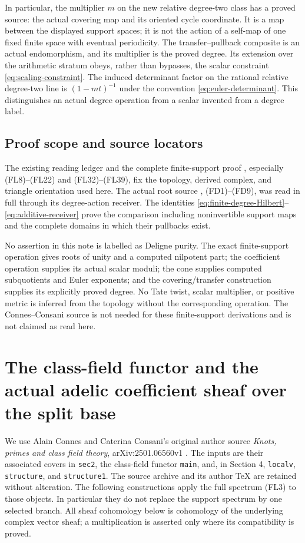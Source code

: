 \documentclass[11pt,a4paper]{article}
\theoremstyle{definition}\newtheorem{definition}[theorem]{Definition}
\begin{document}
In particular, the multiplier $m$ on the new relative degree-two
class has a proved source: the actual covering map and its oriented
cycle coordinate. It is a map between the displayed support spaces;
it is not the action of a self-map of one fixed finite space with
eventual periodicity. The transfer--pullback composite is an actual
endomorphism, and its multiplier is the proved degree. Its extension
over the arithmetic stratum obeys, rather than bypasses, the scalar
constraint \eqref{eq:scaling-constraint}. The induced determinant
factor on the rational relative degree-two line is $(1-mt)^{-1}$
under the convention \eqref{eq:euler-determinant}. This distinguishes
an actual degree operation from a scalar invented from a degree label.

\subsection{Proof scope and source locators}

The existing reading ledger and the complete finite-support proof
, especially (FL8)--(FL22)
and (FL32)--(FL39), fix the topology, derived complex, and triangle
orientation used here. The actual root source
,
(FD1)--(FD9), was read in full through its degree-action receiver.
The identities \eqref{eq:finite-degree-Hilbert}--\eqref{eq:additive-receiver}
prove the comparison including noninvertible support maps and the
complete domains in which their pullbacks exist.

No assertion in this note is labelled as Deligne purity. The exact
finite-support operation gives roots of unity and a computed nilpotent
part; the coefficient operation supplies its actual scalar moduli;
the cone supplies computed subquotients and Euler exponents; and the
covering/transfer construction supplies its explicitly proved degree.
No Tate twist, scalar multiplier, or positive metric is inferred from
the topology without the corresponding operation. The Connes--Consani
source is not needed for these finite-support derivations and is not
claimed as read here.


\section{The class-field functor and the actual adelic coefficient sheaf over the split base}
\label{sec:connes-support-functor}

We use Alain Connes and Caterina Consani's original author source
\emph{Knots, primes and class field theory}, arXiv:2501.06560v1
\cite{ConnesConsani2025}. The inputs are their associated covers in
\texttt{sec2}, the class-field functor \texttt{main}, and, in Section 4,
\texttt{localv}, \texttt{structure}, and \texttt{structure1}.
The source archive and its author TeX are retained without alteration.
The following constructions apply the full spectrum (FL3) to those
objects. In particular they do not replace the support spectrum by
one selected branch. All sheaf cohomology below is cohomology of the
underlying complex vector sheaf; a multiplication is asserted only
where its compatibility is proved.
\end{document}
